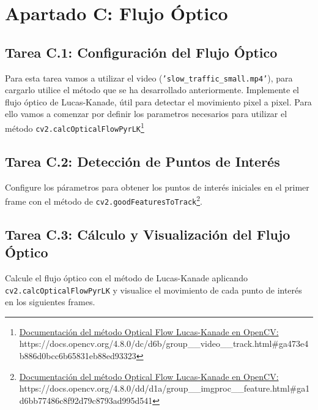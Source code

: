 \chapter{Apartado C: \textbf{Flujo Óptico}}
\label{chapter:tarea_c}

\section*{Tarea C.1: Configuración del Flujo Óptico}
{}
Para esta tarea vamos a utilizar el video (\texttt{'slow\_traffic\_small.mp4'}), para cargarlo utilice el método que se ha desarrollado anteriormente.
Implemente el flujo óptico de Lucas-Kanade, útil para detectar el movimiento pixel a pixel. Para ello vamos a comenzar por definir los parametros necesarios para utilizar el método \texttt{cv2.calcOpticalFlowPyrLK}\footnote{ \href{https://docs.opencv.org/4.8.0/dc/d6b/group\_\_video\_\_track.html\#ga473e4b886d0bcc6b65831eb88ed93323}{Documentación del método Optical Flow Lucas-Kanade en OpenCV:} \\{https://docs.opencv.org/4.8.0/dc/d6b/group\_\_video\_\_track.html\#ga473e4b886d0bcc6b65831eb88ed93323}}

\section*{Tarea C.2: Detección de Puntos de Interés}
{}
Configure los párametros para obtener los puntos de interés iniciales en el primer frame con el método de \texttt{cv2.goodFeaturesToTrack}\footnote{ \href{https://docs.opencv.org/4.8.0/dd/d1a/group\_\_imgproc\_\_feature.html\#ga1d6bb77486c8f92d79c8793ad995d541}{Documentación del método Optical Flow Lucas-Kanade en OpenCV:} \\{https://docs.opencv.org/4.8.0/dd/d1a/group\_\_imgproc\_\_feature.html\#ga1d6bb77486c8f92d79c8793ad995d541}}.

\section*{Tarea C.3: Cálculo y Visualización del Flujo Óptico}
{}
Calcule el flujo óptico con el método de Lucas-Kanade aplicando \texttt{cv2.calcOpticalFlowPyrLK} y visualice el movimiento de cada punto de interés en los siguientes frames.


